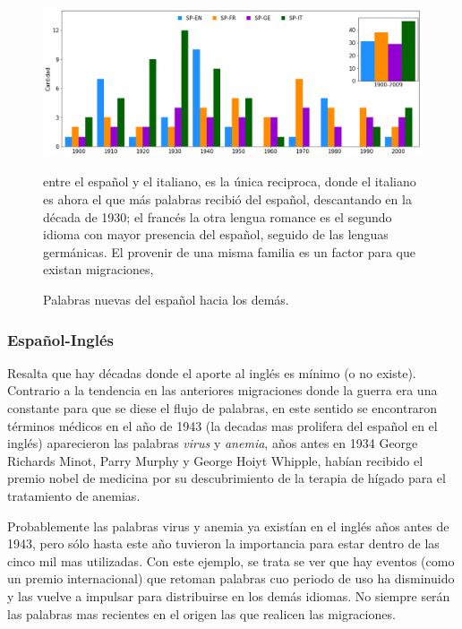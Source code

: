 \begin{figure}[h!]
	\centering
	\includegraphics[scale=.38]{Cap_3/NC_SP.png}
	\label{fig.NC_SP}
	\caption{Palabras nuevas del español hacia los demás.}
	\smallskip
	\small
	entre el español y el italiano, es la única reciproca, donde  el italiano es ahora el que más palabras recibió del español, descantando en la década de 1930; el francés la otra lengua romance es el segundo idioma con mayor presencia del español, seguido de las lenguas germánicas. El provenir de una misma familia es un factor para que existan migraciones,
	
\end{figure}

\subsubsection*{Español-Inglés}%

Resalta que hay décadas donde el aporte al inglés es mínimo (o no existe). Contrario a la tendencia en las anteriores migraciones donde la guerra era una constante para que se diese el flujo de palabras, en este sentido se encontraron términos médicos en el año de 1943 (la decadas mas prolifera del español en el inglés) aparecieron las palabras \textit{virus} y \textit{anemia}, años antes en 1934 George Richards Minot, Parry Murphy y George Hoiyt Whipple, habían recibido el premio nobel de medicina por su descubrimiento de la terapia de hígado para el tratamiento de anemias.   

Probablemente las palabras virus y anemia ya existían en el inglés años antes de 1943,  pero sólo hasta este año tuvieron la importancia para estar dentro de las cinco mil mas utilizadas. Con este ejemplo, se trata se ver que hay eventos (como un premio internacional) que retoman palabras cuo periodo de uso  ha disminuido y las vuelve a impulsar para distribuirse en los demás idiomas.   No siempre serán las palabras mas recientes en el origen las que realicen las migraciones. 

